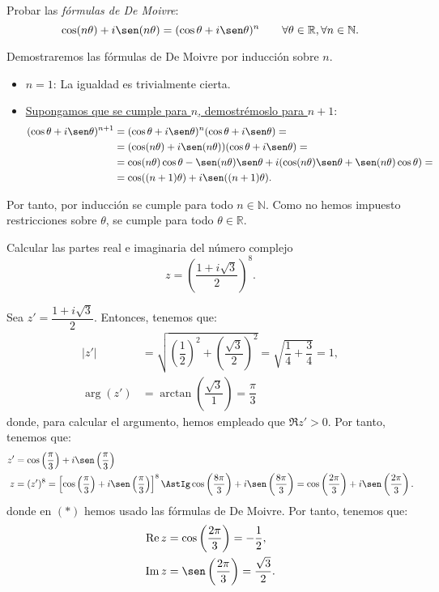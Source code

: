 \begin{ejercicio}
    Probar las \emph{fórmulas de De Moivre}:
    \[
        \cos(n\theta) + i\sen(n\theta) = (\cos\theta + i\sen\theta)^n \qquad \forall \theta \in \mathbb{R}, \forall n \in \mathbb{N}.
    \]

    Demostraremos las fórmulas de De Moivre por inducción sobre $n$.
    \begin{itemize}
        \item \ul{$n=1$}: La igualdad es trivialmente cierta.
        \item \ul{Supongamos que se cumple para $n$, demostrémoslo para $n+1$}:
        \begin{align*}
            (\cos\theta + i\sen\theta)^{n+1}
            &= (\cos\theta + i\sen\theta)^n(\cos\theta + i\sen\theta)
            =\\&= (\cos(n\theta) + i\sen(n\theta))(\cos\theta + i\sen\theta)
            =\\&= \cos(n\theta)\cos\theta - \sen(n\theta)\sen\theta + i(\cos(n\theta)\sen\theta + \sen(n\theta)\cos\theta) = \\&=
            \cos((n+1)\theta) + i\sen((n+1)\theta).
        \end{align*}
    \end{itemize}

    Por tanto, por inducción se cumple para todo $n\in \mathbb{N}$. Como no hemos impuesto restricciones sobre $\theta$, se cumple para todo $\theta \in \mathbb{R}$.
\end{ejercicio}

\begin{ejercicio}
    Calcular las partes real e imaginaria del número complejo
    \[
        z=\left(\dfrac{1+i\sqrt{3}}{2}\right)^8.
    \]

    Sea $z'=\dfrac{1+i\sqrt{3}}{2}$. Entonces, tenemos que:
    \begin{align*}
        |z'| &= \sqrt{\left(\dfrac{1}{2}\right)^2+\left(\dfrac{\sqrt{3}}{2}\right)^2} = \sqrt{\dfrac{1}{4}+\dfrac{3}{4}} = 1, \\
        \arg (z') &= \arctan\left(\dfrac{\sqrt{3}}{1}\right) = \dfrac{\pi}{3}
    \end{align*}
    donde, para calcular el argumento, hemos empleado que $\Re z'>0$. Por tanto, tenemos que:
    \begin{align*}
        z' &= \cos\left(\dfrac{\pi}{3}\right) + i\sen\left(\dfrac{\pi}{3}\right) \\
        z &= (z')^8 = \left[\cos\left(\dfrac{\pi}{3}\right) + i\sen\left(\dfrac{\pi}{3}\right)\right]^8 \AstIg \cos\left(\dfrac{8\pi}{3}\right) + i\sen\left(\dfrac{8\pi}{3}\right) = \cos\left(\dfrac{2\pi}{3}\right) + i\sen\left(\dfrac{2\pi}{3}\right). 
    \end{align*}
    donde en $(\ast)$ hemos usado las fórmulas de De Moivre.    Por tanto, tenemos que:
    \begin{align*}
        \Re z &= \cos\left(\dfrac{2\pi}{3}\right) = -\dfrac{1}{2}, \\
        \Im z &= \sen\left(\dfrac{2\pi}{3}\right) = \dfrac{\sqrt{3}}{2}.
    \end{align*}
\end{ejercicio}

